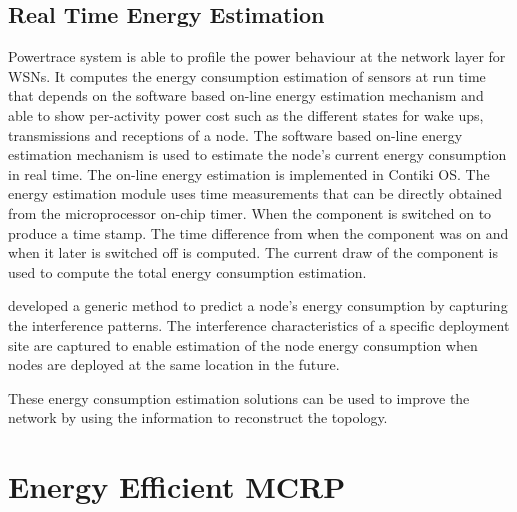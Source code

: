 \subsection{Real Time Energy Estimation}
Powertrace system \cite{dunkels2011powertrace} is able to profile the power behaviour at the network layer for WSNs. It computes the energy consumption estimation of sensors at run time that depends on the software based on-line energy estimation mechanism \cite{dunkels2007software} and able to show per-activity power cost such as the different states for wake ups, transmissions and receptions of a node.
The software based on-line energy estimation mechanism is used to estimate the node's current energy consumption in real time. The on-line energy estimation is implemented in Contiki OS. The energy estimation module uses time measurements that can be directly obtained from the microprocessor on-chip timer. When the component is switched on to produce a time stamp. The time difference from when the component was on and when it later is switched off is computed. The current draw of the component is used to compute the total energy consumption estimation.


\cite{alexlifetime} developed a generic method to predict a node's energy consumption by capturing the interference patterns. The interference characteristics of a specific deployment site are captured to enable estimation of the node energy consumption when nodes are deployed at the same location in the future.

These energy consumption estimation solutions can be used to improve the network by using the information to reconstruct the topology.


\section{Energy Efficient MCRP}


